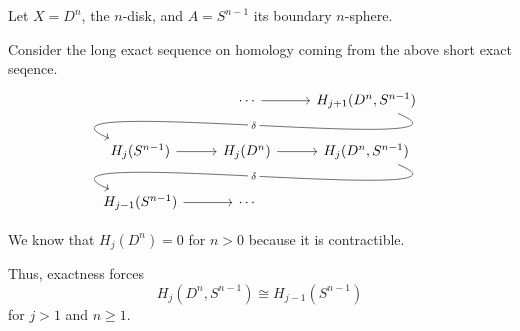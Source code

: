 \documentclass[main.tex]{subfiles}
\begin{document}
\begin{example}
  Let $X = D^{n}$, the $n$-disk, and $A = S^{n-1}$ its boundary $n$-sphere. 
  
  Consider the long exact sequence on homology coming from the above short exact seqence.
  \begin{equation*}
    \begin{tikzcd}
      & \cdots
      \arrow[r]
      & H_{j+1}(D^{n}, S^{n-1})
      \\
      H_{j}(S^{n-1})
      \arrow[from=urr, out=-22, in=157, looseness=1, overlay, "\delta" description]
      \arrow[r,]
      & H_{j}(D^{n})
      \arrow[r,]
      & H_{j}(D^{n}, S^{n-1})
      \\
      H_{j-1}(S^{n-1})
      \arrow[r]
      \arrow[from=urr, out=-22, in=157, looseness=1, overlay, "\delta" description]
      & \cdots
    \end{tikzcd}
  \end{equation*}

  We know that $H_{j}(D^{n}) = 0$ for $n > 0$ because it is contractible.
  
  Thus, exactness forces
  \begin{equation*}
    H_{j}(D^{n}, S^{n-1}) \cong H_{j-1}(S^{n-1})
  \end{equation*}
  for $j > 1$ and $n \geq 1$.

\end{example}
\end{document}
